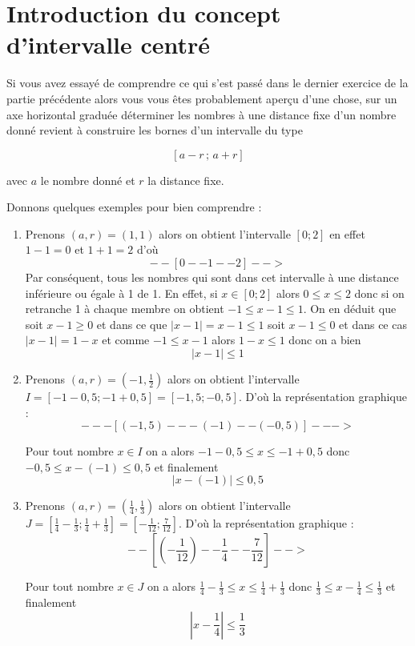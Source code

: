 \documentclass[a4paper, 11pt, twoside]{book}
\newcommand{\ceintr}[2]{\left[#1\,;\,#2\right]}
\newcommand{\disk}[3]{\left\lvert #1 - #2 \right\rvert \leq #3}
\begin{document}
\section{Introduction du concept d'intervalle centré}
\label{sec:orgad10744}

Si vous avez essayé de comprendre ce qui s'est passé dans le
dernier exercice de la partie précédente alors vous vous êtes
probablement aperçu d'une chose, sur un axe horizontal graduée
déterminer les nombres à une distance fixe d'un nombre donné
revient à construire les bornes d'un intervalle du type

\[\ceintr{a - r}{a + r}\]

avec \(a\) le nombre donné et \(r\) la distance fixe.

Donnons quelques exemples pour bien comprendre :

\begin{enumerate}
\item Prenons \((a, r) = (1,1)\) alors on obtient l'intervalle \([0 ; 2]\)
en effet \(1 - 1 = 0\) et \(1 + 1 = 2\) d'où \[--[0--1--2]-->\]
Par conséquent, tous les nombres qui sont dans cet intervalle à
une distance inférieure ou égale à 1 de 1. En effet, si \(x\in [0
      ; 2]\) alors \(0\leq x\leq 2\) donc si on retranche 1 à chaque
membre on obtient \(-1\leq x - 1\leq 1\). On en déduit que soit
\(x - 1 \geq 0\) et dans ce que \(\lvert x - 1\rvert = x - 1\leq 1\)
soit \(x - 1 \leq 0\) et dans ce cas \(\lvert x - 1\rvert = 1 - x\)
et comme \(-1\leq x - 1\) alors \(1 - x\leq 1\) donc on a bien
\[\disk{x}{1}{1}\]
\item Prenons \((a, r) = \left(-1,\frac{1}{2}\right)\) alors on obtient
l'intervalle \(I = [-1 - 0,5 ; -1 + 0,5] = [-1,5 ; -0,5]\). D'où la
représentation graphique :
\[---[(-1,5)---(-1)--(-0,5)]--->\]

Pour tout nombre \(x\in I\) on a alors \(-1 - 0,5 \leq x \leq -1 +
      0,5\) donc \(-0,5\leq x - (-1)\leq 0,5\) et finalement
\[\disk{x}{(-1)}{0,5}\]
\item Prenons \((a, r) = \left(\frac{1}{4},\frac{1}{3}\right)\) alors on obtient
l'intervalle \(J = \left[\frac{1}{4} - \frac{1}{3} ;
      \frac{1}{4} + \frac{1}{3}\right] = \left[-\frac{1}{12} ;
      \frac{7}{12}\right]\). D'où la représentation graphique :
\[--\left[\left(-\frac{1}{12}\right)--\frac{1}{4}--\frac{7}{12}\right]-->\]

Pour tout nombre \(x\in J\) on a alors \(\frac{1}{4} -
      \frac{1}{3} \leq x \leq \frac{1}{4} + \frac{1}{3}\) donc
\(\frac{1}{3}\leq x - \frac{1}{4}\leq \frac{1}{3}\) et
finalement \[\disk{x}{\frac{1}{4}}{\frac{1}{3}}\]
\end{enumerate}
\end{document}
